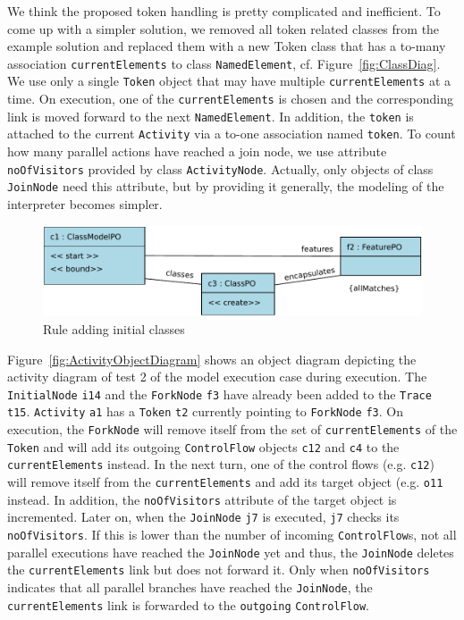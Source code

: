 \documentclass[submission,copyright,creativecommons]{eptcs}
\begin{document}
We think the proposed token handling is pretty complicated and inefficient. To come up with a simpler solution, we removed all token related classes from the example solution and replaced them with a new Token class that has a to-many association \texttt{currentElements} to class \texttt{NamedElement}, cf. Figure~\ref{fig:ClassDiag}. We use only a single \texttt{Token} object that may have multiple \texttt{currentElements} at a time. On execution, one of the \texttt{currentElements} is chosen and the corresponding link is moved forward to the next \texttt{NamedElement}. In addition, the \texttt{token} is attached to the current \texttt{Activity} via a to-one association named \texttt{token}. To count how many parallel actions have reached a join node, we use attribute \texttt{noOfVisitors} provided by class \texttt{ActivityNode}. Actually, only objects of class \texttt{JoinNode} need this attribute, but by providing it generally, the modeling of the interpreter becomes simpler. 


\begin{figure}[ht] \centering
	\includegraphics[width=0.8\linewidth]{images/RuleAddInitialClasses.pdf}
 \caption{Rule adding initial classes}
 \label{fig:RuleInitialClasses}
\end{figure}

Figure~\ref{fig:ActivityObjectDiagram} shows an object diagram depicting the activity diagram of test 2 of the model execution case during execution. The \texttt{InitialNode} \texttt{i14} 
and the \texttt{ForkNode} \texttt{f3} have already been added to the \texttt{Trace} 
\texttt{t15}. \texttt{Activity} \texttt{a1} has a \texttt{Token} \texttt{t2} currently
pointing to \texttt{ForkNode} \texttt{f3}. On execution, the \texttt{ForkNode} will remove itself from the set of \texttt{currentElements} of the \texttt{Token} and will add its 
outgoing \texttt{ControlFlow} objects \texttt{c12} and \texttt{c4} to the \texttt{currentElements} instead. In the next turn, one of the control flows (e.g. \texttt{c12}) 
will remove itself from the \texttt{currentElements} and add its target object (e.g. 
\texttt{o11} instead. In addition, the \texttt{noOfVisitors} attribute of the target object 
is incremented. Later on, when the \texttt{JoinNode} \texttt{j7} is executed, 
\texttt{j7} checks its \texttt{noOfVisitors}. If this is lower than the number of 
incoming \texttt{ControlFlow}s, not all parallel executions have reached the \texttt{JoinNode}
yet and thus, the \texttt{JoinNode} deletes the \texttt{currentElements} link but does not 
forward it. Only when \texttt{noOfVisitors} indicates that all parallel branches have reached 
the \texttt{JoinNode}, the \texttt{currentElements} link is forwarded to the \texttt{outgoing}
\texttt{ControlFlow}.  
\end{document}
